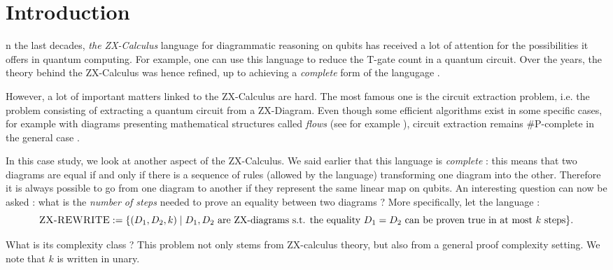 \documentclass[journal,onecolumn]{IEEEtran}
\begin{document}
\section{Introduction}
% 
% 
% 
% 
n the last decades, \textit{the ZX-Calculus} language for diagrammatic reasoning on qubits has received a lot of attention for the possibilities it offers in quantum computing. For example, one can use this language to reduce the T-gate count in a quantum circuit. Over the years, the theory behind the ZX-Calculus was hence refined, up to achieving a \textit{complete} form of the langugage \cite{ZXcompleteness}.

However, a lot of important matters linked to the ZX-Calculus are hard. The most famous one is the circuit extraction problem, i.e. the problem consisting of extracting a quantum circuit from a ZX-Diagram. Even though some efficient algorithms exist in some specific cases, for example with diagrams presenting mathematical structures called \textit{flows} (see for example \cite{ZXflowEfficient}), circuit extraction remains \#P-complete in the general case \cite{ZXSharpHard}.

In this case study, we look at another aspect of the ZX-Calculus. We said earlier that this language is \textit{complete} : this means that two diagrams are equal if and only if there is a sequence of rules (allowed by the language) transforming one diagram into the other. Therefore it is always possible to go from one diagram to another if they represent the same linear map on qubits. An interesting question can now be asked : what is the \textit{number of steps} needed to prove an equality between two diagrams ? More specifically, let the language :
$$
\textsc{ZX-REWRITE} := \{ (D_1, D_2, k) \; | \; D_1, D_2 \text{ are ZX-diagrams s.t. the equality } D_1=D_2 \text{ can be proven true in at most } k \text{ steps}\}.
$$ 

What is its complexity class ? This problem not only stems from ZX-calculus theory, but also from a general proof complexity setting. We note that $k$ is written in unary. 
\end{document}
